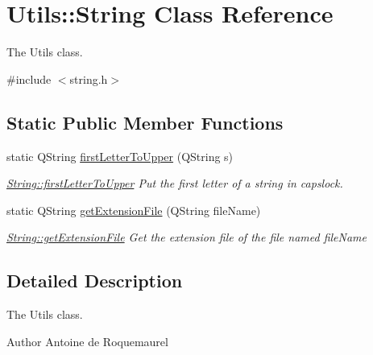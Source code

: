 \hypertarget{classUtils_1_1String}{\section{Utils\-:\-:String Class Reference}
\label{classUtils_1_1String}
}


The Utils class.  




{\ttfamily \#include $<$string.\-h$>$}

\subsection*{Static Public Member Functions}
\begin{DoxyCompactItemize}
\item 
static Q\-String \hyperlink{classUtils_1_1String_a9ccf44a6e09a1391001304570ba615a3}{first\-Letter\-To\-Upper} (Q\-String s)
\begin{DoxyCompactList}\small\item\em \hyperlink{classUtils_1_1String_a9ccf44a6e09a1391001304570ba615a3}{String\-::first\-Letter\-To\-Upper} Put the first letter of a string in capslock. \end{DoxyCompactList}\item 
static Q\-String \hyperlink{classUtils_1_1String_a6e5477352fbd3a4a0caed50bb14c0062}{get\-Extension\-File} (Q\-String file\-Name)
\begin{DoxyCompactList}\small\item\em \hyperlink{classUtils_1_1String_a6e5477352fbd3a4a0caed50bb14c0062}{String\-::get\-Extension\-File} Get the extension file of the file named {\itshape file\-Name} \end{DoxyCompactList}\end{DoxyCompactItemize}


\subsection{Detailed Description}
The Utils class. 

\begin{DoxyAuthor}{Author}
Antoine de Roquemaurel 
\end{DoxyAuthor}


